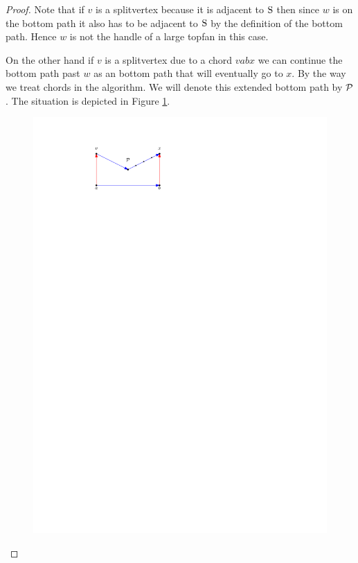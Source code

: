     \begin{proof}
      Note that if $v$ is a splitvertex because it is adjacent to $\pS$ then since $w$ is on the bottom path it also has to be adjacent to $\pS$ by the definition of the bottom path.
      Hence $w$ is not the handle of a large topfan in this case.

      On the other hand if $v$ is a splitvertex due to a chord $v a b x$ we can continue the bottom path past $w$ as an bottom path that will eventually go to $x$. By the way we treat chords in the algorithm.  We will denote this extended bottom path by $\P$. The situation is depicted in Figure \ref{fig:botomPathChord}.

      \begin{figure}[h]
        \centering
        \includegraphics[scale=1]{unifiedAlgo/img/sweep/bottompathChord.pdf}
        \caption{}
        \label{fig:botomPathChord}
      \end{figure}


\end{proof}
